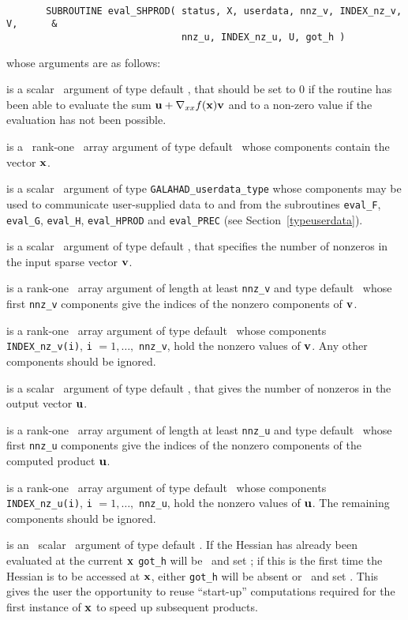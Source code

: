 \documentclass{galahad}
\begin{document}
\def\baselinestretch{0.8}
{\tt
\begin{verbatim}
       SUBROUTINE eval_SHPROD( status, X, userdata, nnz_v, INDEX_nz_v, V,      &
                               nnz_u, INDEX_nz_u, U, got_h )
\end{verbatim} }
\def\baselinestretch{1.0}
\noindent whose arguments are as follows:

\begin{description}
 is a scalar \intentout\ argument of type default \integer,
that should be set to 0 if the routine has been able to evaluate the
sum ${\mathbf{u}} + \nabla_{xx} f({\mathbf{x}}) {\mathbf{v}}$
and to a non-zero value if the evaluation has not been possible.

 is a \ rank-one \intentin\ array argument of type
default \realdp\ whose components contain the vector ${\mathbf{x}}$.

 is a scalar \intentinout\ argument of type
{\tt GALAHAD\_userdata\_type} whose components may be used
to communicate user-supplied data to and from the
subroutines {\tt eval\_F}, {\tt eval\_G},
{\tt eval\_H}, {\tt eval\_HPROD} and {\tt eval\_PREC}
(see Section~\ref{typeuserdata}).

 is a scalar \intentin\ argument of type default \integer,
that specifies the number of nonzeros in the input sparse vector
${\mathbf{v}}$.

 is a rank-one \intentin\ array argument of length
at least {\tt nnz\_v} and type default \integer\
whose first {\tt nnz\_v} components
give the indices of the nonzero components of ${\mathbf{v}}$.

 is a rank-one \intentin\ array argument of type default \realdp\
whose components {\tt INDEX\_nz\_v(i)}, {\tt i} $= 1, \ldots,$ {\tt nnz\_v},
hold the nonzero values of ${\mathbf{v}}$. Any other components should be ignored.

\itt{nnz\_u} is a scalar \intentout\ argument of type default \integer,
that gives the number of nonzeros in the output vector ${\mathbf{u}}$.

 is a rank-one \intentout\ array argument of length
at least {\tt nnz\_u} and type default \integer\
whose first {\tt nnz\_u} components give the indices of the
nonzero components of the computed product ${\mathbf{u}}$.

\ittf{U} is a rank-one \intentout\ array argument of type default \realdp\
whose components {\tt INDEX\_nz\_u(i)}, {\tt i} $= 1, \ldots,$ {\tt nnz\_u},
hold the nonzero values of ${\mathbf{u}}$. The remaining components should be ignored.

\ittf{got\_h} is an \optional\ scalar \intentin\ argument of type default
\logical. If the Hessian has already been evaluated at the current ${\mathbf{x}}$
{\tt got\_h} will be \present\ and set \true; if this is the first time
the Hessian is to be accessed at ${\mathbf{x}}$, either {\tt got\_h} will be absent
or \present\ and set \false. This gives the user the opportunity
to reuse ``start-up'' computations required for the first instance of
${\mathbf{x}}$ to speed up subsequent products.

\end{description}
\end{document}
